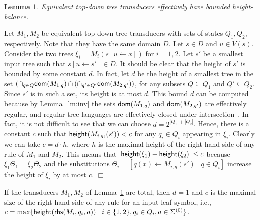 \documentclass[copyright,creativecommons]{eptcs}
\newtheorem{lemma}{Lemma}
\newcommand{\eop}{\hspace*{\fill}$\Box$}
\newenvironment{proof}{{\it Proof.}\quad}{\eop\vspace*{4mm}}
\newcommand{\height}[1]{{\sf height}(#1)}
\newcommand{\dom}[1]{{\sf dom}(#1)}
\def\rhs{{\sf rhs}}
\begin{document}
\begin{lemma}\rm\label{lm:bd}
Equivalent top-down tree transducers
effectively have bounded height-balance.
\end{lemma}
\begin{proof}
Let $M_1, M_2$ be equivalent top-down tree transducers 
with sets of states $Q_1, Q_2$, respectively.
Note that they have the same domain $D$.
Let $s\in D$ and $u\in V(s)$.
Consider the two trees 
$\xi_i=M_i(s[u\leftarrow x])$ for $i=1,2$.
Let $s'$ be a smallest input tree such that 
$s[u\leftarrow s']\in D$.
It should be clear that the height of $s'$ is bounded
by some constant $d$. 
In fact, let $d$ be the height of a smallest tree in the
set $(\cap_{q\in Q}\dom{M_{1,q}}\cap(\cap_{q'\in Q'}\dom{M_{2,q'}})$,
for any subsets $Q\subseteq Q_1$ and $Q'\subseteq Q_2$. 
Since $s'$ is in such a set, its height is at most $d$.
This bound $d$ can be computed because by Lemma~\ref{lm:inv}
the sets $\dom{M_{1,q}}$ and $\dom{M_{2,q'}}$
are effectively regular, and regular
tree languages are effectively closed under intersection~\cite{tata07}.
In fact, it is not difficult to see that we can choose
$d=2^{|Q_1|+|Q_2|}$.
Hence, there is a constant $c$ such that 
$\height{M_{i,q_i}(s')}<c$ for any $q_i\in Q_i$
appearing in $\xi_i$. 
Clearly we can take $c=d\cdot h$, where $h$ is the maximal height
of the right-hand side of any rule of $M_1$ and $M_2$.
This means that $|\height{\xi_1}-\height{\xi_2}|\leq c$ because
$\xi_1\Theta_1=\xi_2\Theta_2$ and the substitutions
$\Theta_i=[q(x)\leftarrow M_{i,q}(s')\mid q\in Q_i]$
increase the height of $\xi_i$ by at most $c$.
\end{proof}

If the transducers $M_1, M_2$ of Lemma~\ref{lm:bd} are
total, then $d=1$ and $c$ is the maximal size of the right-hand
side of any rule for an input leaf symbol, i.e., 
$c=\max\{\height{\rhs(M_i,q_i,a)}\mid i\in\{1,2\}, q_i\in Q_i, a\in\Sigma^{(0)}\}$.
\end{document}

